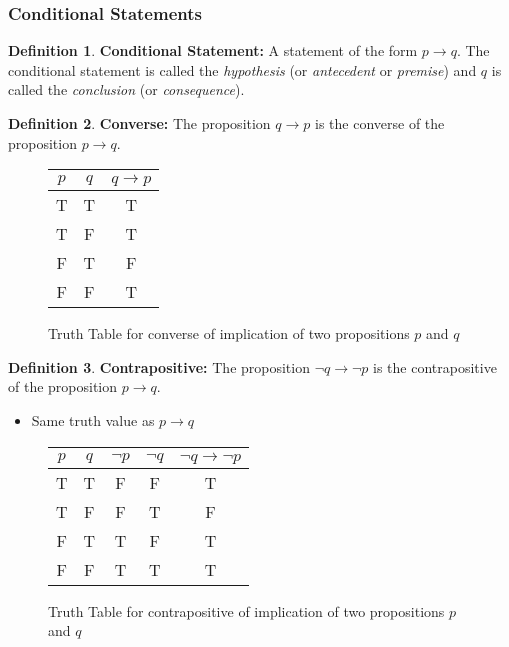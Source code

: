 \documentclass[article, 11pt]{article}
\theoremstyle{definition}
\newtheorem{definition}{Definition}[subsubsection]
\begin{document}
    \subsubsection{Conditional Statements}
    \begin{definition}
        \textbf{Conditional Statement:} A statement of the form $p \to q$. The conditional statement is called the \textit{hypothesis} (or \textit{antecedent} or \textit{premise}) and $q$ is called the \textit{conclusion} (or \textit{consequence}). 
    \end{definition}
    \begin{definition}
        \textbf{Converse:} The proposition $q \to p$ is the converse of the proposition $p \to q$. 
    \end{definition}
    \begin{figure}[H]
        \centering
            \begin{tabular}{c|c|c}
                $p$ & $q$ & $q \to p$ \\
                \hline
                T & T & T \\
                T & F & T \\
                F & T & F \\
                F & F & T 
            \end{tabular}   
        \caption{Truth Table for converse of implication of two propositions $p$ and $q$}
    \end{figure}
    \begin{definition}
        \textbf{Contrapositive:} The proposition $\neg q \to \neg p$ is the contrapositive of the proposition $p \to q$.  
    \end{definition}
    \begin{itemize}
        \item Same truth value as $p \to q$
    \end{itemize}
    \begin{figure}[H]
        \centering
            \begin{tabular}{c|c|c|c|c}
                $p$ & $q$ & $\neg{p}$ & $\neg{q}$ & $\neg q \to \neg p$ \\
                \hline
                T & T & F & F & T \\
                T & F & F & T & F \\
                F & T & T & F & T \\
                F & F & T & T & T
            \end{tabular}   
        \caption{Truth Table for contrapositive of implication of two propositions $p$ and $q$}
    \end{figure}
\end{document}
